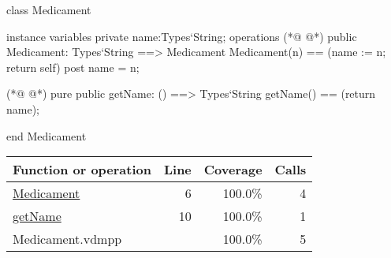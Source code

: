 \begin{vdmpp}[breaklines=true]
class Medicament

instance variables
  private name:Types`String;
operations
(*@
\label{Medicament:6}
@*)
 public Medicament: Types`String ==> Medicament
  Medicament(n) == (name := n; return self)
 post name = n;
 
(*@
\label{getName:10}
@*)
 pure public getName: () ==> Types`String
  getName() == (return name);

end Medicament
\end{vdmpp}
\bigskip
\begin{longtable}{|l|r|r|r|}
\hline
Function or operation & Line & Coverage & Calls \\
\hline
\hline
\hyperref[Medicament:6]{Medicament} & 6&100.0\% & 4 \\
\hline
\hyperref[getName:10]{getName} & 10&100.0\% & 1 \\
\hline
\hline
Medicament.vdmpp & & 100.0\% & 5 \\
\hline
\end{longtable}

